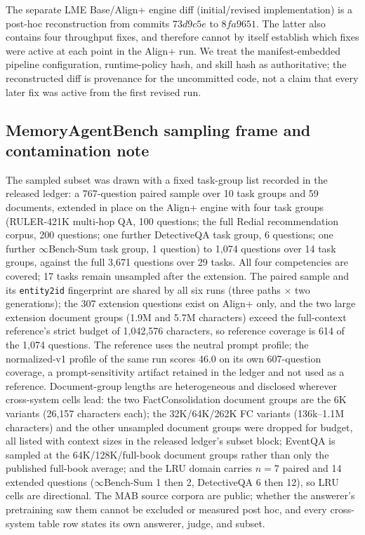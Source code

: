 The separate LME Base/Align+ engine diff (initial/revised implementation) is a post-hoc reconstruction from commits $73d9c5e$ to $8fa9651$. The latter also contains four throughput fixes, and therefore cannot by itself establish which fixes were active at each point in the Align+ run. We treat the manifest-embedded pipeline configuration, runtime-policy hash, and skill hash as authoritative; the reconstructed diff is provenance for the uncommitted code, not a claim that every later fix was active from the first revised run.

\subsection{MemoryAgentBench sampling frame and contamination note}
\label{app:sampling}

The sampled subset was drawn with a fixed task-group list recorded in the released ledger: a 767-question paired sample over 10 task groups and 59 documents, extended in place on the Align+ engine with four task groups (RULER-421K multi-hop QA, 100 questions; the full Redial recommendation corpus, 200 questions; one further DetectiveQA task group, 6 questions; one further $\infty$Bench-Sum task group, 1 question) to 1{,}074 questions over 14 task groups, against the full 3{,}671 questions over 29 tasks. All four competencies are covered; 17 tasks remain unsampled after the extension. The paired sample and its \texttt{entity2id} fingerprint are shared by all six runs (three paths $\times$ two generations); the 307 extension questions exist on Align+ only, and the two large extension document groups (1.9M and 5.7M characters) exceed the full-context reference's strict budget of 1{,}042{,}576 characters, so reference coverage is 614 of the 1{,}074 questions. The reference uses the neutral prompt profile; the normalized-v1 profile of the same run scores 46.0 on its own 607-question coverage, a prompt-sensitivity artifact retained in the ledger and not used as a reference. Document-group lengths are heterogeneous and disclosed wherever cross-system cells lead: the two FactConsolidation document groups are the 6K variants (26{,}157 characters each); the 32K/64K/262K FC variants (136k--1.1M characters) and the other unsampled document groups were dropped for budget, all listed with context sizes in the released ledger's subset block; EventQA is sampled at the 64K/128K/full-book document groups rather than only the published full-book average; and the LRU domain carries $n{=}7$ paired and 14 extended questions ($\infty$Bench-Sum 1 then 2, DetectiveQA 6 then 12), so LRU cells are directional. The MAB source corpora are public; whether the answerer's pretraining saw them cannot be excluded or measured post hoc, and every cross-system table row states its own answerer, judge, and subset.

